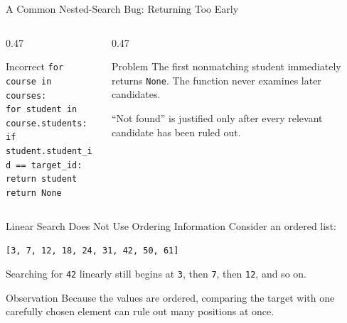 \documentclass[aspectratio=169,10pt]{beamer}
\begin{document}
\begin{frame}{A Common Nested-Search Bug: Returning Too Early}
  \begin{columns}[T,onlytextwidth]
    \begin{column}{0.47\textwidth}
      \begin{alertblock}{Incorrect}
        \footnotesize
        \texttt{for course in courses:}\\
        \hspace*{0.20in}\texttt{for student in course.students:}\\
        \hspace*{0.40in}\texttt{if student.student\_id == target\_id:}\\
        \hspace*{0.60in}\texttt{return student}\\
        \hspace*{0.40in}\texttt{return None}
      \end{alertblock}
    \end{column}
    \begin{column}{0.47\textwidth}
      \begin{block}{Problem}
        The first nonmatching student immediately returns \texttt{None}. The function never examines later candidates.
      \end{block}

      \begin{keyidea}
        ``Not found'' is justified only after every relevant candidate has been ruled out.
      \end{keyidea}
    \end{column}
  \end{columns}
\end{frame}


\begin{frame}{Linear Search Does Not Use Ordering Information}
  Consider an ordered list:

  \begin{center}
    \Large\texttt{[3, 7, 12, 18, 24, 31, 42, 50, 61]}
  \end{center}

  Searching for \texttt{42} linearly still begins at \texttt{3}, then \texttt{7}, then \texttt{12}, and so on.

  \begin{block}{Observation}
    Because the values are ordered, comparing the target with one carefully chosen element can rule out many positions at once.
  \end{block}
\end{frame}
\end{document}

